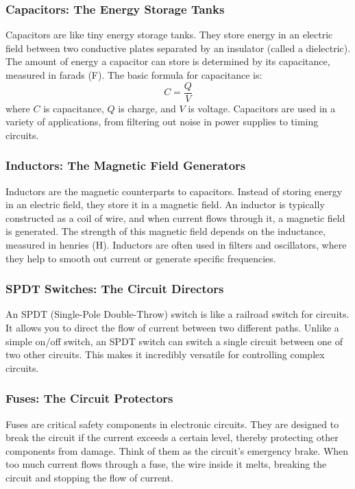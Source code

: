 \subsubsection*{Capacitors: The Energy Storage Tanks}
Capacitors are like tiny energy storage tanks. They store energy in an electric field between two conductive plates separated by an insulator (called a dielectric). The amount of energy a capacitor can store is determined by its capacitance, measured in farads (F). The basic formula for capacitance is:
\begin{equation}
    C = \frac{Q}{V}
\end{equation}
where $C$ is capacitance, $Q$ is charge, and $V$ is voltage. Capacitors are used in a variety of applications, from filtering out noise in power supplies to timing circuits.

\subsubsection*{Inductors: The Magnetic Field Generators}
Inductors are the magnetic counterparts to capacitors. Instead of storing energy in an electric field, they store it in a magnetic field. An inductor is typically constructed as a coil of wire, and when current flows through it, a magnetic field is generated. The strength of this magnetic field depends on the inductance, measured in henries (H). Inductors are often used in filters and oscillators, where they help to smooth out current or generate specific frequencies.

\subsubsection*{SPDT Switches: The Circuit Directors}
An SPDT (Single-Pole Double-Throw) switch is like a railroad switch for circuits. It allows you to direct the flow of current between two different paths. Unlike a simple on/off switch, an SPDT switch can switch a single circuit between one of two other circuits. This makes it incredibly versatile for controlling complex circuits.

\subsubsection*{Fuses: The Circuit Protectors}
Fuses are critical safety components in electronic circuits. They are designed to break the circuit if the current exceeds a certain level, thereby protecting other components from damage. Think of them as the circuit's emergency brake. When too much current flows through a fuse, the wire inside it melts, breaking the circuit and stopping the flow of current.

